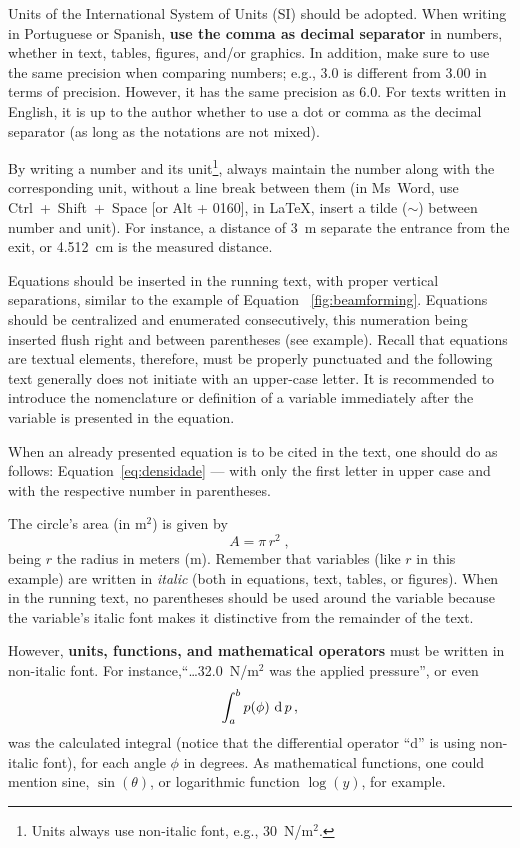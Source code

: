\documentclass[12pt, a4paper, twoside, twocolumn]{article}
\begin{document}
Units of the International System of Units (SI) should be adopted. When writing in Portuguese or Spanish, \textbf{use the comma as decimal separator} in numbers, whether in text, tables, figures, and/or graphics. In addition, make sure to use the same precision when comparing numbers; e.g., 3.0 is different from 3.00 in terms of precision. However, it has the same precision as 6.0. For texts written in English, it is up to the author whether to use a dot or comma as the decimal separator (as long as the notations are not mixed). 

By writing a number and its unit\footnote{Units always use non-italic font, e.g., 30~N/m$^2$.}, always maintain the number along with the corresponding unit, without a line break between them (in Ms~Word, use Ctrl~+~Shift~+~Space [or Alt + 0160], in \LaTeX, insert a tilde ($\sim$) between number and unit). For instance, a distance of 3~m separate the entrance from the exit, or 4.512~cm is the measured distance.

Equations should be inserted in the running text, with proper vertical separations, similar to the example of Equation ~\eqref{fig:beamforming}. Equations should be centralized and enumerated consecutively, this numeration being inserted flush right and between parentheses (see example). Recall that equations are textual elements, therefore, must be properly punctuated and the following text generally does not initiate with an upper-case letter. It is recommended to introduce the nomenclature or definition of a variable immediately after the variable is presented in the equation.

When an already presented equation is to be cited in the text, one should do as follows: Equation~\eqref{eq:densidade} --- with only the first letter in upper case and with the respective number in parentheses.

The circle's area (in m$^2$) is given by
\begin{equation}
	A = \pi \, r^2\;,
\label{eq:area-circ}
\end{equation}
being $r$ the radius in meters (m). 
%
Remember that variables (like $r$ in this example) are written in \textit{italic} (both in equations, text, tables, or figures). When in the running text, no parentheses should be used around the variable because the variable's italic font makes it distinctive from the remainder of the text. 

However, \textbf{units, functions, and mathematical operators} must be written in non-italic font. For instance,``\ldots  32.0~N/m$^2$ was the applied pressure'', or even
%
\begin{equation}
	\int_a^b p(\phi)\, \operatorname{d} p\,,
\label{eq:int}
\end{equation}
%
was the calculated integral (notice that the differential operator ``d'' is using non-italic font), for each angle $\phi$ in degrees. As mathematical functions, one could mention sine, $\sin(\theta)$, or logarithmic function $\log(y)$, for example.
\end{document}
